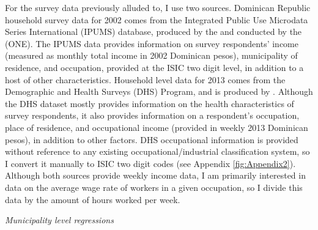 \documentclass[12pt]{article}
\begin{document}
For the survey data previously alluded to, I use two sources. 
Dominican Republic household survey data for 2002 comes from the 
Integrated Public Use Microdata Series International
(IPUMS) database, produced by the \citet{ipumsi} and conducted by the
\citet{one} (ONE). The IPUMS data provides information on 
survey respondents' income (measured as monthly total income in
2002 Dominican pesos), municipality of residence, and occupation,
provided at the ISIC two digit level, in addition to a host of other characteristics.
Household level data for 2013 comes from the 
Demographic and Health Surveys (DHS) Program, and is produced by \citet{dhs}.
Although the DHS dataset mostly provides information on the health 
characteristics of survey respondents, it also provides 
information on a respondent's occupation, place of residence,
and occupational income (provided in weekly 2013 Dominican pesos), in addition to other factors. 
DHS occupational information is provided without reference to any existing occupational/industrial 
classification system, so I convert it manually to
ISIC two digit codes (see Appendix \ref{fig:Appendix2}).
Although both sources provide weekly income data, I am primarily interested in data
on the average wage rate of workers in a given occupation, so I divide this data by the amount of
hours worked per week. %

\textit{Municipality level regressions}
\end{document}
